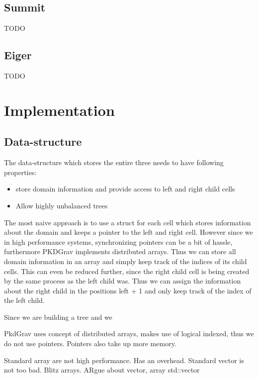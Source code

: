 \documentclass[]{article}
\begin{document}
\subsection{Summit}

TODO

\subsection{Eiger}

TODO 

\section{Implementation}

\subsection{Data-structure}

The data-structure which stores the entire three needs to have following properties:

\begin{itemize}
	\item store domain information and provide access to left and right child cells
	\item Allow highly unbalanced trees
\end{itemize}

The most naive approach is to use a struct for each cell which stores information about the domain and keeps a pointer to the left and right cell. However since we in high performance systems, synchronizing pointers can be a bit of hassle, furthermore PKDGrav implements distributed arrays. Thus we can store all domain information in an array and simply keep track of the indices of its child cells. This can even be reduced further, since the right child cell is being created by the same process as the left child was. Thus we can assign the information about the right child in the positions left + 1 and only keep track of the index of the left child.

Since we are building a tree and we 


PkdGrav uses concept of distributed arrays, makes use of logical indexed, thus we do not use pointers. Pointers also take up more memory. 

Standard array are not high performance. Has an overhead. Standard vector is not too bad. Blitz arrays. 
ARgue about vector, array std::vector
\end{document}
